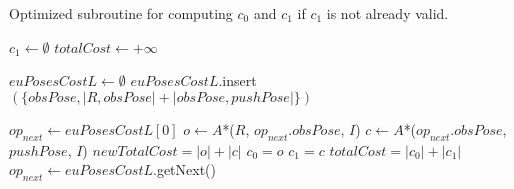 \begin{algorithm}[H]

  \caption{Optimized subroutine for computing $c_{0}$ and $c_{1}$ if $c_{1}$ is not already valid.}

  \label{alg:04-custom-observation-optimized-compute01c1}

  \begin{algorithmic}[1]

      \State $c_{1} \gets \emptyset$
      \State $totalCost \gets +\infty$


      \State $euPosesCostL \gets \emptyset$ 
        \State $euPosesCostL$.insert$(\{obsPose, |{R, obsPose}| + |{obsPose, pushPose}|\})$
      \EndFor

        \State $op_{next} \gets euPosesCostL[0]$
          \State $o \gets A$*($R$, $op_{next}.obsPose$, $I$)
          \State $c \gets A$*($op_{next}.obsPose$, $pushPose$, $I$)
          \State $newTotalCost = |o| + |c|$
            \State $c_{0} = o$
            \State $c_{1} = c$
            \State $totalCost = |c_{0}| + |c_{1}|$
          \EndIf
          \State $op_{next} \gets euPosesCostL$.getNext()
        \EndWhile
      \EndIf
    \EndProcedure

  \end{algorithmic}
\end{algorithm}
